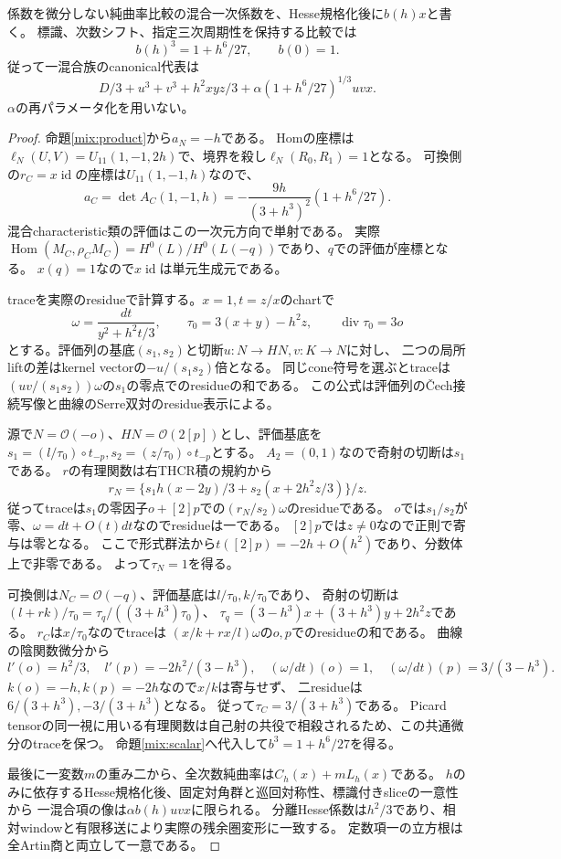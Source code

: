 \begin{theorem}\label{mix:b}
係数を微分しない純曲率比較の混合一次係数を、Hesse規格化後に$b(h)x$と書く。
標識、次数シフト、指定三次周期性を保持する比較では
\[
 b(h)^3=1+h^6/27,\qquad b(0)=1.
\]
従って一混合族のcanonical代表は
\[
 D/3+u^3+v^3+h^2xyz/3+\alpha(1+h^6/27)^{1/3}uvx.
\]
$\alpha$の再パラメータ化を用いない。
\end{theorem}
\begin{proof}
命題\ref{mix:product}から$a_N=-h$である。
Homの座標は$\ell_N(U,V)=U_{11}(1,-1,2h)$で、境界を殺し$\ell_N(R_0,R_1)=1$となる。
可換側の$r_C=x\operatorname{id}$の座標は$U_{11}(1,-1,h)$なので、
\[
 a_C=\det A_C(1,-1,h)=-\frac{9h}{(3+h^3)^2}(1+h^6/27).
\]
混合characteristic類の評価はこの一次元方向で単射である。
実際$\operatorname{Hom}(M_C,\rho_CM_C)=H^0(L)/H^0(L(-q))$であり、$q$での評価が座標となる。
$x(q)=1$なので$x\operatorname{id}$は単元生成元である。

traceを実際のresidueで計算する。$x=1,t=z/x$のchartで
\[
 \omega=\frac{dt}{y^2+h^2t/3},\qquad\tau_0=3(x+y)-h^2z,
 \qquad\operatorname{div}\tau_0=3o
\]
とする。評価列の基底$(s_1,s_2)$と切断$u:N\to HN,v:K\to N$に対し、
二つの局所liftの差はkernel vectorの$-u/(s_1s_2)$倍となる。
同じcone符号を選ぶとtraceは$(uv/(s_1s_2))\omega$の$s_1$の零点でのresidueの和である。
この公式は評価列のČech接続写像と曲線のSerre双対のresidue表示\cite{Tate}による。

源で$N=\mathcal O(-o)$、$HN=\mathcal O(2[p])$とし、評価基底を
$s_1=(l/\tau_0)\circ t_{-p},s_2=(z/\tau_0)\circ t_{-p}$とする。
$A_2=(0,1)$なので奇射の切断は$s_1$である。
$r$の有理関数は右THCR積の規約から
\[
 r_N=\{s_1h(x-2y)/3+s_2(x+2h^2z/3)\}/z.
\]
従ってtraceは$s_1$の零因子$o+[2]p$での$(r_N/s_2)\omega$のresidueである。
$o$では$s_1/s_2$が零、$\omega=dt+O(t)dt$なのでresidueは一である。
$[2]p$では$z\ne0$なので正則で寄与は零となる。
ここで形式群法から$t([2]p)=-2h+O(h^2)$であり、分数体上で非零である。
よって$\tau_N=1$を得る。

可換側は$N_C=\mathcal O(-q)$、評価基底は$l/\tau_0,k/\tau_0$であり、
奇射の切断は$(l+rk)/\tau_0=\tau_q/((3+h^3)\tau_0)$、
$\tau_q=(3-h^3)x+(3+h^3)y+2h^2z$である。
$r_C$は$x/\tau_0$なのでtraceは
$(x/k+rx/l)\omega$の$o,p$でのresidueの和である。
曲線の陰関数微分から
\[
 l'(o)=h^2/3,\quad l'(p)=-2h^2/(3-h^3),\quad
 (\omega/dt)(o)=1,\quad(\omega/dt)(p)=3/(3-h^3).
\]
$k(o)=-h,k(p)=-2h$なので$x/k$は寄与せず、
二residueは$6/(3+h^3),-3/(3+h^3)$となる。
従って$\tau_C=3/(3+h^3)$である。
Picard tensorの同一視に用いる有理関数は自己射の共役で相殺されるため、この共通微分のtraceを保つ。
命題\ref{mix:scalar}へ代入して$b^3=1+h^6/27$を得る。

最後に一変数$m$の重み二から、全次数純曲率は$C_h(x)+mL_h(x)$である。
$h$のみに依存するHesse規格化後、固定対角群と巡回対称性、標識付きsliceの一意性から
一混合項の像は$\alpha b(h)uvx$に限られる。
分離Hesse係数は$h^2/3$であり、相対windowと有限移送により実際の残余圏変形に一致する。
定数項一の立方根は全Artin商と両立して一意である。
\end{proof}


